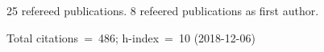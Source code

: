 25 refereed publications. 8 refeered publications as first author.

Total citations~=~486; h-index~=~10 (2018-12-06)